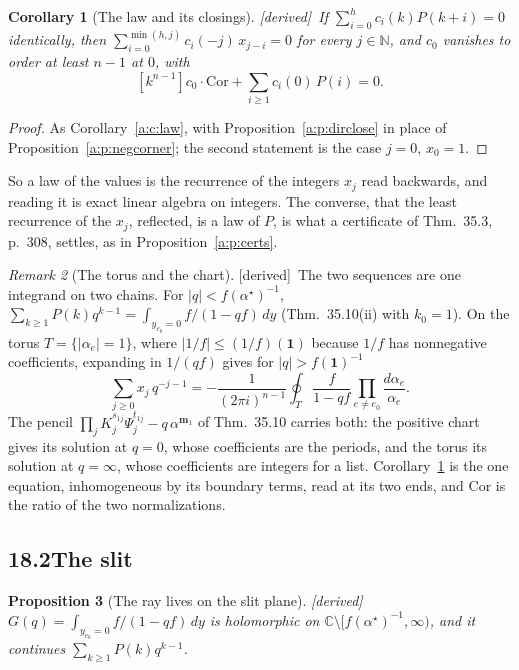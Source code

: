 \documentclass[11pt]{article}
\newcommand{\one}{\mathbf 1}
\newcommand{\mvec}{\mathbf m}
\theoremstyle{plain}
\newtheorem{proposition}{Proposition}[section]
\newtheorem{corollary}[proposition]{Corollary}
\theoremstyle{definition}
\theoremstyle{remark}
\newtheorem{remark}[proposition]{Remark}
\newcommand{\derived}{\textup{[derived]}}
\begin{document}
\begin{corollary}[The law and its closings]\label{a:c:dirlaw}\derived\
If $\sum_{i=0}^hc_i(k)P(k+i)=0$ identically, then $\sum_{i=0}^{\min(h,j)}c_i(-j)\,x_{j-i}=0$ for every $j\in\mathbb N$, and $c_0$ vanishes to order at least $n-1$ at $0$, with
\[
[k^{n-1}]c_0\cdot\mathrm{Cor}+\sum_{i\ge1}c_i(0)\,P(i)=0 .
\]
\end{corollary}

\begin{proof}
As Corollary~\ref{a:c:law}, with Proposition~\ref{a:p:dirclose} in place of Proposition~\ref{a:p:negcorner}; the second statement is the case $j=0$, $x_0=1$.
\end{proof}

So a law of the values is the recurrence of the integers $x_j$ read backwards, and reading it is exact linear algebra on integers. The converse, that the least recurrence of the $x_j$, reflected, is a law of $P$, is what a certificate of Thm.~35.3, p.~308, settles, as in Proposition~\ref{a:p:certs}.

\begin{remark}[The torus and the chart]\label{a:r:twochains}\derived\
The two sequences are one integrand on two chains. For $|q|<f(\alpha^\star)^{-1}$, $\sum_{k\ge1}P(k)q^{k-1}=\int_{y_{e_0}=0}f/(1-qf)\,dy$ (Thm.~35.10(ii) with $k_0=1$). On the torus $T=\{|\alpha_e|=1\}$, where $|1/f|\le(1/f)(\one)$ because $1/f$ has nonnegative coefficients, expanding in $1/(qf)$ gives for $|q|>f(\one)^{-1}$
\[
\sum_{j\ge0}x_j\,q^{-j-1}=-\frac1{(2\pi i)^{n-1}}\oint_{T}\frac{f}{1-qf}\prod_{e\ne e_0}\frac{d\alpha_e}{\alpha_e}.
\]
The pencil $\prod_jK_j^{s_{1j}}\Psi_j^{t_{1j}}-q\,\alpha^{\mvec_1}$ of Thm.~35.10 carries both: the positive chart gives its solution at $q=0$, whose coefficients are the periods, and the torus its solution at $q=\infty$, whose coefficients are integers for a list. Corollary~\ref{a:c:dirlaw} is the one equation, inhomogeneous by its boundary terms, read at its two ends, and $\mathrm{Cor}$ is the ratio of the two normalizations.
\end{remark}

\subsection*{18.2\quad The slit}

\begin{proposition}[The ray lives on the slit plane]\label{a:p:slit}\derived\
$G(q)=\int_{y_{e_0}=0}f/(1-qf)\,dy$ is holomorphic on $\mathbb C\setminus[f(\alpha^\star)^{-1},\infty)$, and it continues $\sum_{k\ge1}P(k)q^{k-1}$.
\end{proposition}
\end{document}
